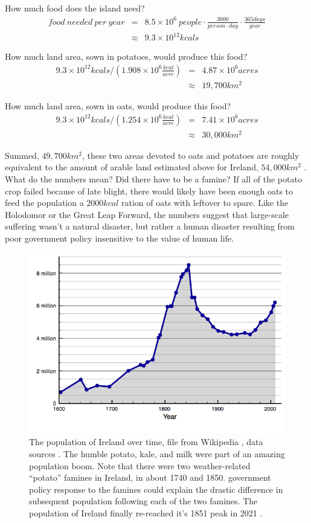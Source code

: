 \documentclass[12pt]{iopart}
\newcommand{\bea}{\begin{eqnarray}}
\newcommand{\eea}{\end{eqnarray}}
\begin{document}
How much food does the island need?
\bea
food~needed~per~year &=& 8.5\times10^6~people
	\cdot \frac{3000}{person\cdot day }
	\cdot \frac{365days}{year} \nonumber \\
&\approx& 9.3\times 10^{12} kcals \nonumber
\eea       

How much land area, sown in potatoes, would produce this food?
\bea
9.3\times10^{12}kcals /\left(1.908\times 10^6\frac{kcal}{acre}\right) &=& 4.87\times10^6 acres \nonumber\\
 &\approx& 19,700 km^2 \nonumber
\eea

How much land area, sown in oats, would produce this food?
\bea
9.3\times10^{12}kcals /\left(1.254\times10^6\frac{kcal}{acre}\right) &=& 7.41 \times10^6 acres \nonumber \\
 &\approx& 30,000 km^2 \nonumber
\eea

Summed, $49,700km^2$, these two areas devoted to oats and potatoes are roughly equivalent to the amount of arable land estimated above for Ireland, $54,000km^2$ \cite{arable_percentage}.  What do the numbers mean?  Did there have to be a famine?  If all of the potato crop failed because of late blight, there would likely have been enough oats to feed the population a $2000kcal$ ration of oats with leftover to spare.  
Like the Holodomor or the Great Leap Forward, the numbers suggest that large-scale suffering wasn't  a natural disaster, but rather a human disaster resulting from poor government policy insensitive to the value of human life.    



\begin{figure}[ht!]
\centering
\includegraphics[width=\columnwidth]{Population_of_Ireland_since_1600.png}
\caption{
The population of Ireland over time, file from Wikipedia \cite{pop_image}, data sources \cite{pop_sources}. The humble potato, kale, and milk were part of an amazing population boom.  Note that there were two weather-related ``potato'' famines in Ireland, in about 1740 and 1850.  government policy response to the famines could explain the drastic difference in subsequent population following each of the two famines.  The population of Ireland finally re-reached it's 1851 peak in 2021 \cite{Ireland_5M}.  
}
\label{ireland_population}
\end{figure}
\end{document}
